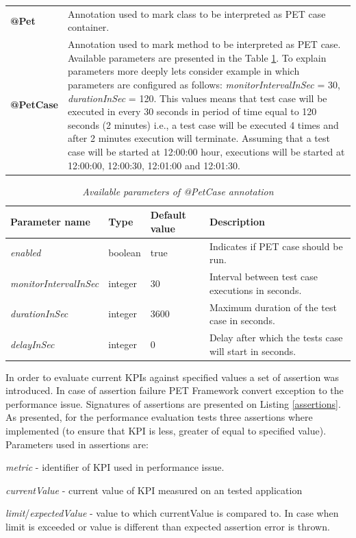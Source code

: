 \documentclass[10pt,a4paper]{article}
\let\tempone\itemize
\let\temptwo\enditemize
\renewenvironment{itemize}{\tempone\addtolength{\itemsep}{-0.4\baselineskip}}{\temptwo}
\begin{document}
\begin{table}[!htb]
\def\arraystretch{1.5}
\begin{tabularx}{\textwidth}{p{1.4cm}X}
\textbf{@Pet} 	  & Annotation used to mark class to be interpreted as PET case container. \\ 
\textbf{@PetCase} & Annotation used to mark method to be interpreted as PET case. Available parameters are presented in the Table \ref{petcase}. To explain parameters more deeply lets consider example in which parameters are configured as follows: \textit{monitorIntervalInSec} = 30, \textit{durationInSec} = 120. This values means that test case will be executed in every 30 seconds in period of time equal to 120 seconds (2 minutes) i.e., a test case will be executed 4 times and after 2 minutes execution will terminate. Assuming that a test case will be started at 12:00:00 hour, executions will be started at 12:00:00, 12:00:30, 12:01:00 and 12:01:30. 
\end{tabularx}
\end{table}

\begin{table}[!htb]
\def\arraystretch{1.5}
\caption{\textit{Available parameters of @PetCase annotation}}\label{petcase}
\begin{tabularx}{\textwidth}{p{3.1cm}|p{1.3cm}|p{1.1cm}|X}
  \textbf{Parameter name} &\textbf{Type} & \textbf{Default value} & \textbf{Description} \\
\hline
			\textit{enabled} & boolean & true & Indicates if PET case should be run.\\
			\textit{monitorIntervalInSec} & integer & 30 & Interval between test case executions in seconds.\\
			\textit{durationInSec} & integer & 3600 & Maximum duration of the test case in seconds.\\
			\textit{delayInSec} & integer & 0 & Delay after which the tests case will start in seconds.\\
\end{tabularx}
\end{table}			

In order to evaluate current KPIs against specified values a set of assertion was introduced. In case of assertion failure PET Framework convert exception to the performance issue. Signatures of assertions are presented on Listing  \ref{assertions}. As presented, for the performance evaluation tests three assertions where implemented (to ensure that KPI is less, greater of equal to specified value).  Parameters used in assertions are: 
\begin{itemize} 
\item \textit{metric} - identifier of KPI used in performance issue.
\item \textit{currentValue} - current value of KPI measured on an tested application
\item \textit{limit}/\textit{expectedValue} - value to which currentValue is compared to. In case when limit is exceeded or value is different than expected assertion error is thrown.
\end{itemize}
\end{document}
